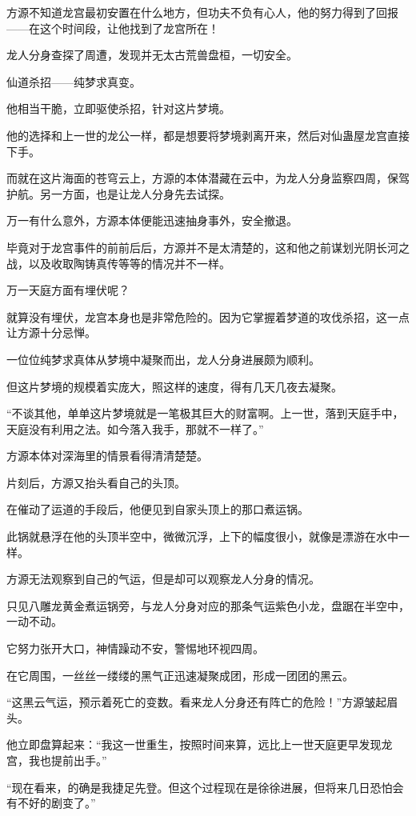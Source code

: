\begin{this_body}
方源不知道龙宫最初安置在什么地方，但功夫不负有心人，他的努力得到了回报——在这个时间段，让他找到了龙宫所在！

龙人分身查探了周遭，发现并无太古荒兽盘桓，一切安全。

仙道杀招——纯梦求真变。

他相当干脆，立即驱使杀招，针对这片梦境。

他的选择和上一世的龙公一样，都是想要将梦境剥离开来，然后对仙蛊屋龙宫直接下手。

而就在这片海面的苍穹云上，方源的本体潜藏在云中，为龙人分身监察四周，保驾护航。另一方面，也是让龙人分身先去试探。

万一有什么意外，方源本体便能迅速抽身事外，安全撤退。

毕竟对于龙宫事件的前前后后，方源并不是太清楚的，这和他之前谋划光阴长河之战，以及收取陶铸真传等等的情况并不一样。

万一天庭方面有埋伏呢？

就算没有埋伏，龙宫本身也是非常危险的。因为它掌握着梦道的攻伐杀招，这一点让方源十分忌惮。

一位位纯梦求真体从梦境中凝聚而出，龙人分身进展颇为顺利。

但这片梦境的规模着实庞大，照这样的速度，得有几天几夜去凝聚。

“不谈其他，单单这片梦境就是一笔极其巨大的财富啊。上一世，落到天庭手中，天庭没有利用之法。如今落入我手，那就不一样了。”

方源本体对深海里的情景看得清清楚楚。

片刻后，方源又抬头看自己的头顶。

在催动了运道的手段后，他便见到自家头顶上的那口煮运锅。

此锅就悬浮在他的头顶半空中，微微沉浮，上下的幅度很小，就像是漂游在水中一样。

方源无法观察到自己的气运，但是却可以观察龙人分身的情况。

只见八雕龙黄金煮运锅旁，与龙人分身对应的那条气运紫色小龙，盘踞在半空中，一动不动。

它努力张开大口，神情躁动不安，警惕地环视四周。

在它周围，一丝丝一缕缕的黑气正迅速凝聚成团，形成一团团的黑云。

“这黑云气运，预示着死亡的变数。看来龙人分身还有阵亡的危险！”方源皱起眉头。

他立即盘算起来：“我这一世重生，按照时间来算，远比上一世天庭更早发现龙宫，我也提前出手。”

“现在看来，的确是我捷足先登。但这个过程现在是徐徐进展，但将来几日恐怕会有不好的剧变了。”


\end{this_body}
